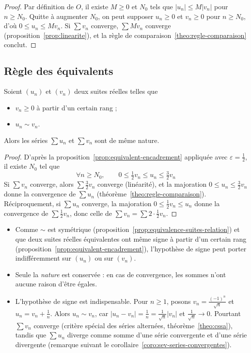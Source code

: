 \begin{proof}
Par définition de $O$, il existe $M\geq 0$ et $N_0$ tels que $|u_n|\leq M|v_n|$ pour $n\geq N_0$. Quitte à augmenter $N_0$, on peut supposer $u_n\geq 0$ et $v_n\geq 0$ pour $n\geq N_0$, d'où $0\leq u_n\leq Mv_n$. Si $\sum v_n$ converge, $\sum Mv_n$ converge (proposition~\ref{prop:linearite}), et la règle de comparaison~\ref{theo:regle-comparaison} conclut.
\end{proof}

\subsection{Règle des équivalents}

\begin{theo}
\label{theo:regle-equivalents}
Soient $(u_n)$ et $(v_n)$ deux suites réelles telles que
\begin{itemize}
\item $v_n\geq 0$ à partir d'un certain rang ;
\item $u_n\sim v_n$.
\end{itemize}
Alors les séries $\sum u_n$ et $\sum v_n$ sont de même nature.
\end{theo}

\begin{proof}
D'après la proposition~\ref{prop:equivalent-encadrement} appliquée avec $\varepsilon=\frac12$, il existe $N_0$ tel que
\[\forall n\geq N_0,\qquad 0\leq\tfrac12 v_n\leq u_n\leq\tfrac32 v_n\]
Si $\sum v_n$ converge, alors $\sum\frac32v_n$ converge (linéarité), et la majoration $0\leq u_n\leq\frac32v_n$ donne la convergence de $\sum u_n$ (théorème~\ref{theo:regle-comparaison}). Réciproquement, si $\sum u_n$ converge, la majoration $0\leq\frac12v_n\leq u_n$ donne la convergence de $\sum\frac12v_n$, donc celle de $\sum v_n=\sum 2\cdot\frac12 v_n$.
\end{proof}

\begin{remarque}
\begin{itemize}
\item Comme $\sim$ est symétrique (proposition~\ref{prop:equivalence-suites-relation}) et que deux suites réelles équivalentes ont même signe à partir d'un certain rang (proposition~\ref{prop:equivalent-encadrement}), l'hypothèse de signe peut porter indifféremment sur $(u_n)$ ou sur $(v_n)$.
\item Seule la \emph{nature} est conservée : en cas de convergence, les sommes n'ont aucune raison d'être égales.
\item L'hypothèse de signe est indispensable. Pour $n\geq 1$, posons $v_n=\frac{(-1)^n}{\sqrt n}$ et $u_n=v_n+\frac1n$. Alors $u_n\sim v_n$, car $\big|u_n-v_n\big|=\frac1n=\frac{1}{\sqrt n}|v_n|$ et $\frac{1}{\sqrt n}\to 0$. Pourtant $\sum v_n$ converge (critère spécial des séries alternées, théorème~\ref{theo:cssa}), tandis que $\sum u_n$ diverge comme somme d'une série convergente et d'une série divergente (remarque suivant le corollaire~\ref{coro:sev-series-convergentes}).
\end{itemize}
\end{remarque}

